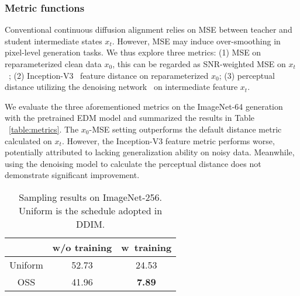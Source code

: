 \documentclass[10pt,twocolumn,letterpaper]{article}
\begin{document}
    



    
    \subsubsection{Metric functions}


    Conventional continuous diffusion alignment relies on MSE between teacher and student intermediate states $x_t$. However, MSE may induce over-smoothing in pixel-level generation tasks. We thus explore three metrics: (1) MSE on reparameterized clean data $x_0$, this can be regarded as SNR-weighted MSE on $x_t$ ~\cite{hang2023efficient}; (2) Inception-V3~\cite{szegedy2016rethinking} feature distance on reparameterized $x_0$; (3) perceptual distance utilizing the denoising network~\cite{dit} on intermediate feature $x_t$.

    
    We evaluate the three aforementioned metrics on the ImageNet-64 generation with the pretrained EDM model and summarized the results in Table ~\ref{table:metrics}. The $x_0$-MSE setting outperforms the default distance metric calculated on $x_t$. However, the Inception-V3 feature metric performs worse, potentially attributed to lacking generalization ability on noisy data. Meanwhile, using the denoising model to calculate the perceptual distance does not demonstrate significant improvement.

\begin{table}[H]


\vspace{-0.2cm}
\centering

\begin{tabular}{c|cc} 
\toprule
                                                                    & \textcolor[rgb]{0.2,0.2,0.2}{w}\textcolor[rgb]{0.2,0.2,0.2}{/o training} & \textcolor[rgb]{0.2,0.2,0.2}{w}\textcolor[rgb]{0.2,0.2,0.2}{~training}               \\ 
\hline
\textcolor[rgb]{0.2,0.2,0.2}{U}\textcolor[rgb]{0.2,0.2,0.2}{niform} & \textcolor[rgb]{0.2,0.2,0.2}{5}\textcolor[rgb]{0.2,0.2,0.2}{2.73}        & \textcolor[rgb]{0.2,0.2,0.2}{2}\textcolor[rgb]{0.2,0.2,0.2}{4.53}                    \\
\textcolor[rgb]{0.2,0.2,0.2}{O}\textcolor[rgb]{0.2,0.2,0.2}{SS}     & \textcolor[rgb]{0.2,0.2,0.2}{4}\textcolor[rgb]{0.2,0.2,0.2}{1.96}        & \textcolor[rgb]{0.2,0.2,0.2}{\textbf{7.89}}  \\
\bottomrule
\end{tabular}
\vspace{-0.2cm}
\caption{Sampling results on ImageNet-256. Uniform is the schedule adopted in DDIM.}
\label{table:distill}
\end{table}
\end{document}
